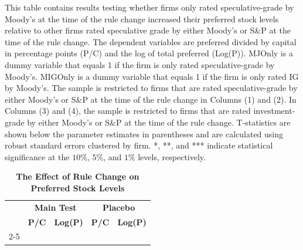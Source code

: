 \documentclass[a4paper, 12pt]{article}
\begin{document}
\begin{table}[htbp]
\caption{\textbf{The Effect of Rule Change on Preferred Stock Levels}
} \label{table_issue}
\begin{singlespace}
\begin{small}

\noindent This table contains results testing whether firms only rated speculative-grade by Moody's at the time of the rule change increased their preferred stock levels relative to other firms rated speculative grade by either Moody's or S\&P at the time of the rule change. The dependent variables are preferred divided by capital in percentage points (P/C) and the log of total preferred (Log(P)). MJOnly is a dummy variable that equals 1 if the firm is only rated speculative-grade by Moody's. MIGOnly is a dummy variable that equals 1 if the firm is only rated IG by Moody's. The sample is restricted to firms that are rated speculative-grade by either Moody's or S\&P at the time of the rule change in Columns (1) and (2). In Columns (3) and (4), the sample is restricted to firms that are rated investment-grade by either Moody's or S\&P at the time of the rule change. T-statistics are shown below the parameter estimates in parentheses and are calculated using robust standard errors clustered by firm. *, **, and *** indicate statistical significance at the $10\%$, $5\%$, and $1\%$ levels, respectively.

\end{small}
\end{singlespace}
\vspace{3mm}
\small
  \centering

\begin{tabular}{lcc|cc}
    \toprule &  \multicolumn{2}{c|}{\textbf{Main Test}} &  \multicolumn{2}{c}{\textbf{Placebo}}
    \\
     &  \multicolumn{1}{c}{\textbf{P/C }} &
       \multicolumn{1}{c|}{\textbf{Log(P)}} &
  \multicolumn{1}{c}{\textbf{P/C }} &
       \multicolumn{1}{c}{\textbf{Log(P)}}
      \\
          \cline{2-5}


    \bottomrule
    \end{tabular}


\end{table}


\clearpage

\newpage
\end{document}
